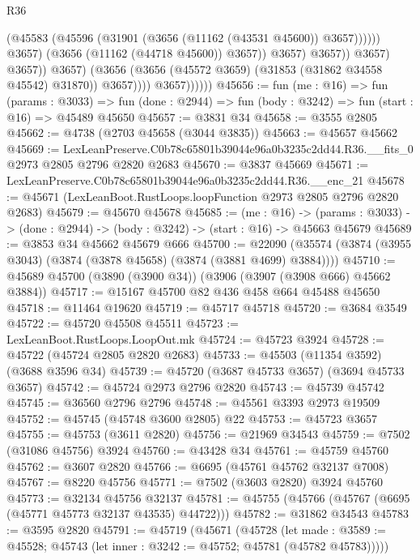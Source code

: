 \begin{lexlean}{R36}
\begin{coremodule}
                                            (@45583
                                              (@45596
                                                (@31901 (@3656 (@11162 (@43531 @45600)) @3657))))))
                                        @3657)
                                      (@3656 (@11162 (@44718 @45600)) @3657))
                                    @3657)
                                  @3657))
                              @3657)
                            @3657))
                        @3657)
                      (@3656 (@3656 (@45572 @3659) (@31853 (@31862 @34558 @45542) @31870)) @3657))))
                @3657))))))
@45656 := fun (me : @16) =>
  fun (params : @3033) =>
  fun (done : @2944) => fun (body : @3242) => fun (start : @16) => @45489 @45650
@45657 := @3831 @34
@45658 := @3555 @2805
@45662 := @4738 (@2703 @45658 (@3044 @3835))
@45663 := @45657 @45662
@45669 := LexLeanPreserve.C0b78c65801b39044e96a0b3235c2dd44.R36.__fits_0
    @2973
    @2805
    @2796
    @2820
    @2683
@45670 := @3837 @45669
@45671 := LexLeanPreserve.C0b78c65801b39044e96a0b3235c2dd44.R36.__enc_21
@45678 := @45671 (LexLeanBoot.RustLoops.loopFunction @2973 @2805 @2796 @2820 @2683)
@45679 := @45670 @45678
@45685 := (me : @16) ->
  (params : @3033) -> (done : @2944) -> (body : @3242) -> (start : @16) -> @45663 @45679
@45689 := @3853 @34 @45662 @45679 @666
@45700 := @22090 (@35574 (@3874 (@3955 @3043) (@3874 (@3878 @45658) (@3874 (@3881 @4699) @3884))))
@45710 := @45689 @45700 (@3890 (@3900 @34)) (@3906 (@3907 (@3908 @666) @45662 @3884))
@45717 := @15167 @45700 @82 @436 @458 @664 @45488 @45650
@45718 := @11464 @19620
@45719 := @45717 @45718
@45720 := @3684 @3549
@45722 := @45720 @45508 @45511
@45723 := LexLeanBoot.RustLoops.LoopOut.mk
@45724 := @45723 @3924
@45728 := @45722 (@45724 @2805 @2820 @2683)
@45733 := @45503 (@11354 @3592) (@3688 @3596 @34)
@45739 := @45720 (@3687 @45733 @3657) (@3694 @45733 @3657)
@45742 := @45724 @2973 @2796 @2820
@45743 := @45739 @45742
@45745 := @36560 @2796 @2796
@45748 := @45561 @3393 @2973 @19509
@45752 := @45745 (@45748 @3600 @2805) @22
@45753 := @45723 @3657
@45755 := @45753 (@3611 @2820)
@45756 := @21969 @34543
@45759 := @7502 (@31086 @45756) @3924
@45760 := @43428 @34
@45761 := @45759 @45760
@45762 := @3607 @2820
@45766 := @6695 (@45761 @45762 @32137 @7008)
@45767 := @8220 @45756
@45771 := @7502 (@3603 @2820) @3924 @45760
@45773 := @32134 @45756 @32137
@45781 := @45755 (@45766 (@45767 (@6695 (@45771 @45773 @32137 @43535) @44722)))
@45782 := @31862 @34543
@45783 := @3595 @2820
@45791 := @45719
    (@45671
      (@45728
        (let made : @3589 := @45528; @45743 (let inner : @3242 := @45752; @45781 (@45782 @45783)))))

\end{coremodule}
\end{lexlean}
